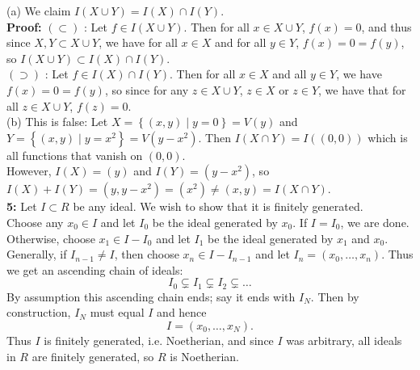 \documentclass[a4paper]{article}
\begin{document}
    (a) We claim $I \left( X \cup Y \right) = I(X) \cap I(Y)$.\\
    \textbf{Proof:} 
    $(\subset )$ : Let $f \in I\left( X \cup Y \right) $. Then for all $x \in
    X \cup Y$, $f(x) = 0$, and thus since $X,Y \subset X \cup Y$, we have
    for all  $x \in X$ and for all $y \in Y$, $f(x) = 0 = f(y)$, so
    $I\left( X\cup Y \right) \subset I(X) \cap I(Y)$.\\
    $(\supset)$ : Let $f \in I \left( X \right) \cap I(Y)$. Then
    for all $x \in X$ and all $y \in Y$, we have $f(x)=0=f(y)$, so since
    for any  $z \in X \cup Y$, $z \in X$ or $z \in Y$, we have
    that for all $z \in X\cup Y$, $f(z) = 0$.\\
    \linebreak
    (b) This is false: Let $X = \left\{ (x,y)  \mid y = 0 \right\} = V(y) $ and
    $Y = \left\{ (x,y)  \mid y = x^2 \right\} = V(y-x^2) $.
    Then $I\left( X \cap Y \right) = I \left( (0,0) \right) $ which is all
    functions that vanish on $\left( 0,0 \right) $.\\
    However, $I(X) = (y)$ and $I(Y) = \left( y-x^2 \right) $, so
    $I(X) + I(Y) = \left( y, y-x^2 \right) = \left( x^2 \right) \neq (x,y)
    = I(X \cap Y)$.\\
    \linebreak
    \textbf{5:} Let $I \subset R$ be any ideal. We wish to show that it is
    finitely generated.\\
    Choose any $x_0 \in I$ and let $I_0$ be the ideal generated by $x_0$.
    If $I = I_0$, we are done. Otherwise, choose $x_1 \in I - I_0$ and
    let $I_1$ be the ideal generated by $x_1$ and $x_0$. Generally, if $I_{n-1}
    \neq I$, then choose $x_n \in I - I_{n-1}$ and let $I_n = 
    \left( x_0, \ldots, x_n \right) $. Thus we get an ascending chain of
    ideals:
    \[
    I_0 \subsetneq I_1 \subsetneq I_2 \subsetneq \ldots
    \] 
    By assumption this ascending chain ends; say it ends with $I_N$. Then 
    by construction,  $I_N$ must equal $I$ and hence
    \[
    I = \left( x_0, \ldots, x_N \right).
    \] 
    Thus $I$ is finitely generated, i.e. Noetherian, and since $I$ was
    arbitrary, all ideals in $R$ are finitely generated, so $R$ is Noetherian.
    

    
    


    
\end{document}
